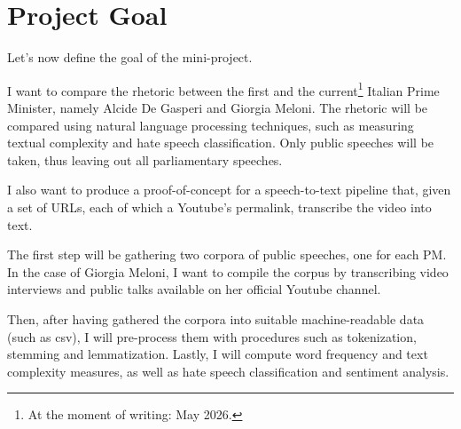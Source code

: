 \section{Project Goal}

Let's now define the goal of the mini-project.

I want to compare the rhetoric between the first and the current\footnote{At the moment of writing: May 2026.} Italian Prime Minister, namely Alcide De Gasperi and Giorgia Meloni. 
The rhetoric will be compared using natural language processing techniques, such as measuring textual complexity and hate speech classification. Only public speeches will be taken, thus leaving out all parliamentary speeches.

I also want to produce a proof-of-concept for a speech-to-text pipeline that, given a set of URLs, each of which a Youtube's permalink, transcribe the video into text. 

The first step will be gathering two corpora of public speeches, one for each PM. In the case of Giorgia Meloni, I want to compile the corpus by transcribing video interviews and public talks available on her official Youtube channel.

Then, after having gathered the corpora into suitable machine-readable data (such as csv), I will pre-process them with procedures such as tokenization, stemming and lemmatization. Lastly, I will compute word frequency and text complexity measures, as well as hate speech classification and sentiment analysis.
